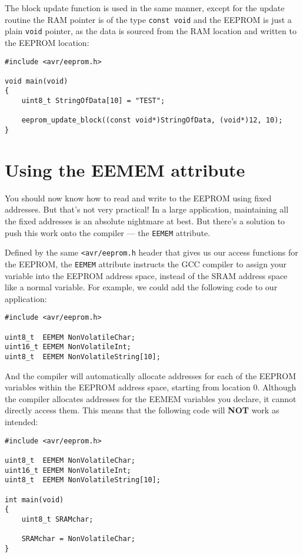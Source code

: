 \documentclass[a4paper,oneside,notitlepage]{book}
\begin{document}
The block update function is used in the same manner, except for the update routine the RAM pointer is of the type \lstinline{const void} and the EEPROM is just a plain \lstinline{void} pointer, as the data is sourced from the RAM location and written to the EEPROM location:

\begin{center}
\begin{lstlisting}
#include <avr/eeprom.h>

void main(void)
{
    uint8_t StringOfData[10] = "TEST";

    eeprom_update_block((const void*)StringOfData, (void*)12, 10);
}
\end{lstlisting}
\end{center}


\chapter{Using the EEMEM attribute}

You should now know how to read and write to the EEPROM using fixed addresses. But that's not very practical! In a large application, maintaining all the fixed addresses is an absolute nightmare at best. But there's a solution to push this work onto the compiler --- the \lstinline{EEMEM} attribute.

Defined by the same \lstinline{<avr/eeprom.h} header that gives us our access functions for the EEPROM, the \lstinline{EEMEM} attribute instructs the GCC compiler to assign your variable into the EEPROM address space, instead of the SRAM address space like a normal variable. For example, we could add the following code to our application:

\begin{center}
\begin{lstlisting}
#include <avr/eeprom.h>

uint8_t  EEMEM NonVolatileChar;
uint16_t EEMEM NonVolatileInt;
uint8_t  EEMEM NonVolatileString[10];
\end{lstlisting}
\end{center}

And the compiler will automatically allocate addresses for each of the EEPROM variables within the EEPROM address space, starting from location 0. Although the compiler allocates addresses for the EEMEM variables you declare, it cannot directly access them. This means that the following code will \textbf{NOT} work as intended:

\begin{center}
\begin{lstlisting}
#include <avr/eeprom.h>

uint8_t  EEMEM NonVolatileChar;
uint16_t EEMEM NonVolatileInt;
uint8_t  EEMEM NonVolatileString[10];

int main(void)
{
    uint8_t SRAMchar;

    SRAMchar = NonVolatileChar;
}
\end{lstlisting}
\end{center}
\end{document}

